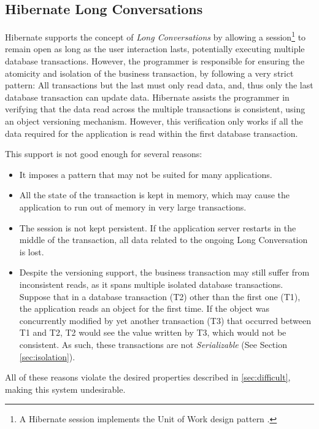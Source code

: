 \subsection{Hibernate Long Conversations}

Hibernate supports the concept of {\it Long Conversations} by allowing
a session\footnote{A Hibernate session implements the Unit of Work
  design pattern \cite{fowler2003patterns}.} to remain open as long as
the user interaction lasts, potentially executing multiple database
transactions. However, the programmer is responsible for ensuring the
atomicity and isolation of the business transaction, by following a
very strict pattern: All transactions but the last must only read
data, and, thus only the last database transaction can update
data. Hibernate assists the programmer in verifying that the data read
across the multiple transactions is consistent, using an object
versioning mechanism. However, this verification only works if all the
data required for the application is read within the first database
transaction.

This support is not good enough for several reasons:

\begin{itemize}
\item It imposes a pattern that may not be suited for many
  applications.
\item All the state of the transaction is kept in memory, which may
  cause the application to run out of memory in very large
  transactions.
\item The session is not kept persistent. If the application server
  restarts in the middle of the transaction, all data related to the
  ongoing Long Conversation is lost.
\item Despite the versioning support, the business transaction may
  still suffer from inconsistent reads, as it spans multiple isolated
  database transactions. Suppose that in a database transaction (T2)
  other than the first one (T1), the application reads an object for
  the first time. If the object was concurrently modified by yet
  another transaction (T3) that occurred between T1 and T2, T2 would
  see the value written by T3, which would not be consistent. As such,
  these transactions are not {\it Serializable} (See Section \ref{sec:isolation}).
\end{itemize}

All of these reasons violate the desired properties described in
\ref{sec:difficult}, making this system undesirable.

